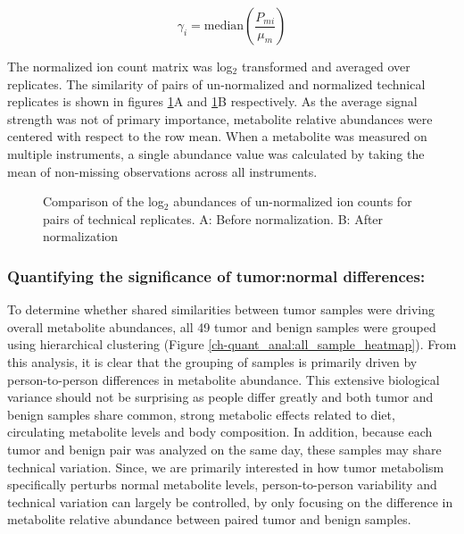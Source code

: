\begin{equation}
\gamma_{i} = \text{median}(\frac{P_{mi}}{\mu_{m}})
\label{normal}
\end{equation}

The normalized ion count matrix was log$_{2}$ transformed and averaged over replicates.  The similarity of pairs of un-normalized and normalized technical replicates is shown in figures \ref{ch-quant_anal:replicate_corr}A and \ref{ch-quant_anal:replicate_corr}B respectively.  As the average signal strength was not of primary importance, metabolite relative abundances were centered with respect to the row mean.  When a metabolite was measured on multiple instruments, a single abundance value was calculated by taking the mean of non-missing observations across all instruments.

\begin{figure}[h!]
\begin{center}
\hspace{1mm}

\caption[Comparison of the log$_{2}$ abundances of un-normalized ion counts for pairs of technical replicates]{Comparison of the log$_{2}$ abundances of un-normalized ion counts for pairs of technical replicates.  A: Before normalization. B: After normalization}
\label{ch-quant_anal:replicate_corr}
\end{center}
\end{figure}

\subsubsection{Quantifying the significance of tumor:normal differences:}

To determine whether shared similarities between tumor samples were driving overall metabolite abundances, all 49 tumor and benign samples were grouped using hierarchical clustering (Figure \ref{ch-quant_anal:all_sample_heatmap}). From this analysis, it is clear that the grouping of samples is primarily driven by person-to-person differences in metabolite abundance.  This extensive biological variance should not be surprising as people differ greatly and both tumor and benign samples share common, strong   metabolic effects related to diet, circulating metabolite levels and body composition.  In addition, because each tumor and benign pair was analyzed on the same day, these samples may share technical variation.  Since, we are primarily interested in how tumor metabolism specifically perturbs normal metabolite levels, person-to-person variability and technical variation can largely be controlled, by only focusing on the difference in metabolite relative abundance between paired tumor and benign samples. 

